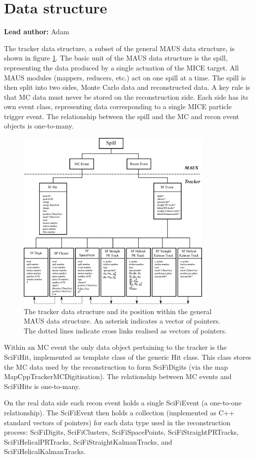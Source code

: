 \section{Data structure}
\label{Sect:DataStructure}

{\bf Lead author:} Adam

The tracker data structure, a subset of the general MAUS data structure, is shown in figure \ref{Fig:DataStructure}.  The basic unit of the MAUS data structure is the spill, representing the data produced by a single actuation of the MICE target.  All MAUS modules (mappers, reducers, etc.) act on one spill at a time.  The spill is then split into two sides, Monte Carlo data and reconstructed data.  A key rule is that MC data must never be stored on the reconstruction side. Each side has its own event class, representing data corresponding to a single MICE particle trigger event.  The relationship between the spill and the MC and recon event objects is one-to-many. 

\begin{figure}[htb]
    \includegraphics[width=0.85\textwidth]
      {05-DataStructure/Figures/DataStructure.eps}
    \caption{The tracker data structure and its position within the general MAUS data structure.  An asterisk indicates a vector of pointers. The dotted lines indicate cross links realised as vectors of pointers.}
    \label{Fig:DataStructure}
\end{figure}

Within an MC event the only data object pertaining to the tracker is the SciFiHit, implemented as template class of the generic Hit class.  This class stores the MC data used by the reconstruction to form SciFiDigits (via the map MapCppTrackerMCDigitisation).  The relationship between MC events and SciFiHits is one-to-many.

On the real data side each recon event holds a single SciFiEvent (a one-to-one relationship). The SciFiEvent then holds a collection (implemented as C++ standard vectors of pointers) for each data type used in the reconstruction process: SciFiDigits, SciFiClusters, SciFiSpacePoints, SciFiStraightPRTracks, SciFiHelicalPRTracks, SciFiStraightKalmanTracks, and  SciFiHelicalKalmanTracks.


